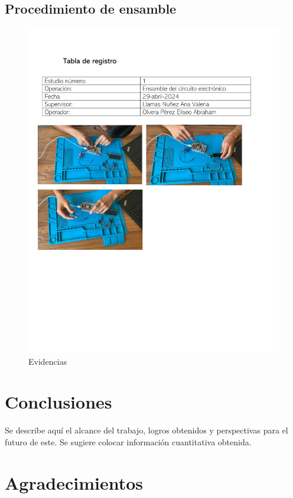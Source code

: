     \subsection{Procedimiento de ensamble}
    \begin{figure}[H]
        \centering
        \includegraphics[trim = {12mm 60mm 12mm 40mm},clip,scale=0.5]{16/Img/tablaDeRegistro.pdf}
        \caption{Evidencias}
        \label{fig:Evidencias}
    \end{figure}
   
    
    \section{Conclusiones}
    
    Se describe aquí el alcance del trabajo, logros obtenidos y perspectivas para el futuro de este. Se sugiere colocar información cuantitativa obtenida.
    
    \section{Agradecimientos}
    
